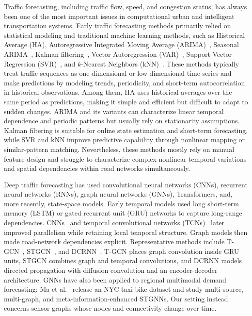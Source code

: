 Traffic forecasting, including traffic flow, speed, and congestion status, has always been one of the most important issues in computational urban and intelligent transportation systems. Early traffic forecasting methods primarily relied on statistical modeling and traditional machine learning methods, such as Historical Average (HA), Autoregressive Integrated Moving Average (ARIMA)~\cite{box2015time}, Seasonal ARIMA~\cite{williams2003modeling}, Kalman filtering~\cite{kumar2017traffic}, Vector Autoregression (VAR)~\cite{schimbinschi2017topology}, Support Vector Regression (SVR)~\cite{wu2004travel}, and $k$-Nearest Neighbors (kNN)~\cite{cai2016spatiotemporal}. These methods typically treat traffic sequences as one-dimensional or low-dimensional time series and make predictions by modeling trends, periodicity, and short-term autocorrelation in historical observations. Among them, HA uses historical averages over the same period as predictions, making it simple and efficient but difficult to adapt to sudden changes. ARIMA and its variants can characterize linear temporal dependence and periodic patterns but usually rely on stationarity assumptions. Kalman filtering is suitable for online state estimation and short-term forecasting, while SVR and kNN improve predictive capability through nonlinear mapping or similar-pattern matching. Nevertheless, these methods mostly rely on manual feature design and struggle to characterize complex nonlinear temporal variations and spatial dependencies within road networks simultaneously.

Deep traffic forecasting has used convolutional neural networks (CNNs), recurrent neural networks (RNNs), graph neural networks (GNNs), Transformers, and, more recently, state-space models. Early temporal models used long short-term memory (LSTM) or gated recurrent unit (GRU) networks to capture long-range dependencies. CNNs~\cite{shih2019temporal} and temporal convolutional networks (TCNs)~\cite{van2016wavenet} later improved parallelism while retaining local temporal structure. Graph models then made road-network dependencies explicit. Representative methods include T-GCN~\cite{zhao2019t}, STGCN~\cite{yu2018spatio}, and DCRNN~\cite{li2018diffusion}. T-GCN places graph convolution inside GRU units, STGCN combines graph and temporal convolutions, and DCRNN models directed propagation with diffusion convolution and an encoder-decoder architecture. GNNs have also been applied to regional multimodal demand forecasting: Ma et al.~\cite{ma2022forecasting} release an NYC taxi-bike dataset and study multi-source, multi-graph, and meta-information-enhanced STGNNs. Our setting instead concerns sensor graphs whose nodes and connectivity change over time.

